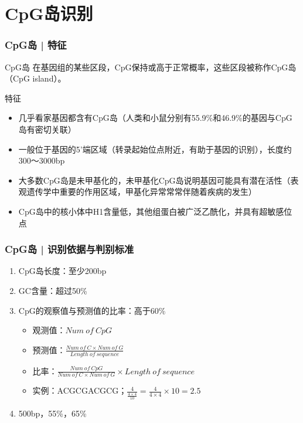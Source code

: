 \section{CpG岛识别}
\begin{frame}
  \frametitle{CpG岛 | 特征}
  \begin{block}{\alert{CpG岛}}
    在基因组的某些区段，CpG保持或高于正常概率，这些区段被称作CpG岛（CpG island）。
  \end{block}
  \pause
  \begin{block}{特征}
    \begin{itemize}
      \item 几乎看家基因都含有CpG岛（人类和小鼠分别有55.9\%和46.9\%的基因与CpG岛有密切关联）
      \item 一般位于基因的5'端区域（转录起始位点附近，有助于基因的识别），长度约300～3000bp
      \item 大多数CpG岛是未甲基化的，未甲基化CpG岛说明基因可能具有潜在活性（表观遗传学中重要的作用区域，甲基化异常常常伴随着疾病的发生）
      \item CpG岛中的核小体中H1含量低，其他组蛋白被广泛乙酰化，并具有超敏感位点
    \end{itemize}
  \end{block}
\end{frame}

\begin{frame}
  \frametitle{CpG岛 | \alert{识别依据与判别标准}}
  \begin{enumerate}
    \item CpG岛长度：至少200bp
    \item GC含量：超过50\%
    \item CpG的观察值与预测值的比率：高于60\%
      \begin{itemize}
        \item 观测值：$Num\ of\ CpG$
          \vspace{0.5em}
        \item 预测值：$\frac{Num\ of\ C \times Num\ of\ G}{Length\ of\ sequence}$
          \vspace{0.5em}
        \item 比率：$\frac{Num\ of\ CpG}{Num\ of\ C \times Num\ of\ G} \times Length\ of\ sequence$
          \vspace{0.5em}
        \item 实例：ACGCGACGCG；$\frac{4}{\frac{4\times4}{10}}=\frac{4}{4\times4}\times10=2.5$
      \end{itemize}
    \pause
    \item 500bp，55\%，65\%
  \end{enumerate}
\end{frame}

